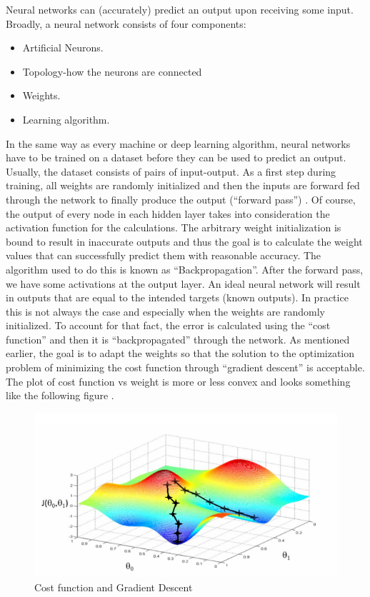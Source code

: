 \par Neural networks can (accurately) predict an output upon receiving some input. Broadly, a neural network consists of four components:
\begin{itemize}
    \item Artificial Neurons.
    \item Topology-how the neurons are connected
    \item Weights.
    \item Learning algorithm.
\end{itemize}
\par In the same way as every machine or deep learning algorithm, neural networks have to be trained on a dataset before they can be used to predict an output. Usually, the dataset consists of pairs of input-output. As a first step during training, all weights are randomly initialized and then the inputs are forward fed through the network to finally produce the output (“forward pass”) \cite{nicholson2019beginner}. Of course, the output of every node in each hidden layer takes into consideration the activation function for the calculations. The arbitrary weight initialization is bound to result in inaccurate outputs and thus the goal is to calculate the weight values that can successfully predict them with reasonable accuracy. The algorithm used to do this is known as “Backpropagation”. After the forward pass, we have some activations at the output layer.  An ideal neural network will result in outputs that are equal to the intended targets (known outputs). In practice this is not always the case and especially when the weights are randomly initialized. To account for that fact, the error is calculated using the “cost function” and then it is “backpropagated” through the network. As mentioned earlier, the goal is to adapt the weights so that the solution to the optimization problem of minimizing the cost function through “gradient descent” is acceptable. The plot of cost function vs weight is more or less convex and looks something like the following figure \cite{cost}.
\begin{figure}[ht!]
\centering
\includegraphics[width=0.6\linewidth]{project/convex.PNG}

\caption{Cost function and Gradient Descent}
\end{figure}
